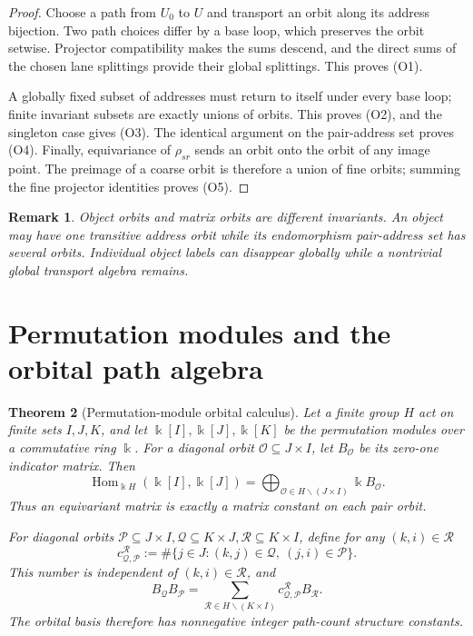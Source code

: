 \documentclass[11pt]{article}
\newtheorem{theorem}{Theorem}[section]
\newtheorem{remark}[theorem]{Remark}
\newcommand{\HomC}{\operatorname{Hom}}
\newcommand{\kk}{\Bbbk}
\begin{document}
\begin{proof}
Choose a path from \(U_0\) to \(U\) and transport an orbit along its address bijection.  Two path choices differ by a base loop, which preserves the orbit setwise.  Projector compatibility makes the sums descend, and the direct sums of the chosen lane splittings provide their global splittings.  This proves (O1).

A globally fixed subset of addresses must return to itself under every base loop; finite invariant subsets are exactly unions of orbits.  This proves (O2), and the singleton case gives (O3).  The identical argument on the pair-address set proves (O4).  Finally, equivariance of \(\rho_{sr}\) sends an orbit onto the orbit of any image point.  The preimage of a coarse orbit is therefore a union of fine orbits; summing the fine projector identities proves (O5).
\end{proof}

\begin{remark}
Object orbits and matrix orbits are different invariants.  An object may have one transitive address orbit while its endomorphism pair-address set has several orbits.  Individual object labels can disappear globally while a nontrivial global transport algebra remains.
\end{remark}

\section{Permutation modules and the orbital path algebra}

\begin{theorem}[Permutation-module orbital calculus]
\label{thm:orbital-calculus}
Let a finite group \(H\) act on finite sets \(I,J,K\), and let \(\kk[I],\kk[J],\kk[K]\) be the permutation modules over a commutative ring \(\kk\).  For a diagonal orbit \(\mathcal O\subseteq J\times I\), let \(B_{\mathcal O}\) be its zero-one indicator matrix.  Then
\[
 \HomC_{\kk H}(\kk[I],\kk[J])
 =
 \bigoplus_{\mathcal O\in H\backslash(J\times I)}\kk B_{\mathcal O}.
\]
Thus an equivariant matrix is exactly a matrix constant on each pair orbit.

For diagonal orbits
\(
 \mathcal P\subseteq J\times I,
 \mathcal Q\subseteq K\times J,
 \mathcal R\subseteq K\times I
\), define for any \((k,i)\in\mathcal R\)
\[
 c^{\mathcal R}_{\mathcal Q,\mathcal P}
 :=\#\{j\in J:(k,j)\in\mathcal Q,\ (j,i)\in\mathcal P\}.
\]
This number is independent of \((k,i)\in\mathcal R\), and
\[
 B_{\mathcal Q}B_{\mathcal P}
 =
 \sum_{\mathcal R\in H\backslash(K\times I)}
 c^{\mathcal R}_{\mathcal Q,\mathcal P}B_{\mathcal R}.
\]
The orbital basis therefore has nonnegative integer path-count structure constants.
\end{theorem}
\end{document}
